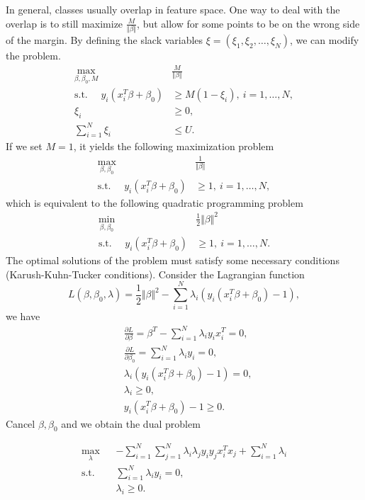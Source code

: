 \documentclass{report}
\theoremstyle{nonumberplain}
\newcommand{\0}{\mathbf{0}}
\begin{document}
In general, classes usually overlap in feature space. One way to deal
with the overlap is to still maximize $\tfrac{M}{\Vert \beta\Vert}$, but allow for some points to be on the wrong side of the margin. By defining the slack variables $\xi=\left(\xi_{1}, \xi_{2}, \ldots, \xi_{N}\right)$, we can modify the problem.
\begin{align*}
\max_{\beta, \beta_{0},M}\ &\frac{M}{\Vert \beta\Vert}\\
\text {s.t. }\quad y_{i}\left(x_{i}^{T} \beta+\beta_{0}\right)& \ge M(1-\xi_i), \ i=1, \ldots, N,\\
\xi_i&\ge 0,\\
\sum_{i=1}^{N}\xi_i&\le U.
\end{align*}
If we set $M=1$, it yields the following maximization problem
\begin{align*}
\max_{\beta, \beta_{0}}\ &\frac{1}{\Vert \beta\Vert}\\
\text {s.t. }\quad y_{i}\left(x_{i}^{T} \beta+\beta_{0}\right)& \ge 1, \ i=1, \ldots, N,
\end{align*}
which is equivalent to the following quadratic programming problem
\begin{align*}
\min_{\beta, \beta_{0}}\ &\frac{1}{2}\Vert \beta\Vert^2\\
\text {s.t. }\quad y_{i}\left(x_{i}^{T} \beta+\beta_{0}\right)& \ge 1, \ i=1, \ldots, N.
\end{align*}
The optimal solutions of the problem must satisfy some necessary conditions (Karush-Kuhn-Tucker conditions). Consider the Lagrangian function
\[
L(\beta, \beta_{0},\lambda)=\frac{1}{2}\Vert \beta\Vert^2-\sum_{i=1}^{N}\lambda_i\left(y_{i}\left(x_{i}^{T} \beta+\beta_{0}\right)-1\right),
\]
we have
\begin{align*}
&\frac{\partial L}{\partial \beta}=\beta^T-\sum_{i=1}^{N}\lambda_iy_{i}x_i^T=0,\\
&\frac{\partial L}{\partial \beta_0}=\sum_{i=1}^{N}\lambda_iy_{i}=0,\\
&\lambda_i\left(y_{i} \left(x_{i}^{T}\beta+\beta_{0}\right)-1\right)=0,\\
&\lambda_i\ge 0,\\
&y_{i}\left(x_{i}^{T} \beta+\beta_{0}\right)-1\ge 0.
\end{align*}
Cancel $\beta,\beta_0$ and we obtain the dual problem

\begin{align*}
\max_{\lambda}\ &-\sum_{i=1}^{N}\sum_{j=1}^{N}\lambda_i\lambda_jy_{i}y_{j}x_{i}^{T}x_{j}+\sum_{i=1}^{N}\lambda_i\\
\text {s.t. }\quad& \sum_{i=1}^{N}\lambda_iy_{i}=0,\\
&\lambda_i\ge 0.
\end{align*}
\end{document}
